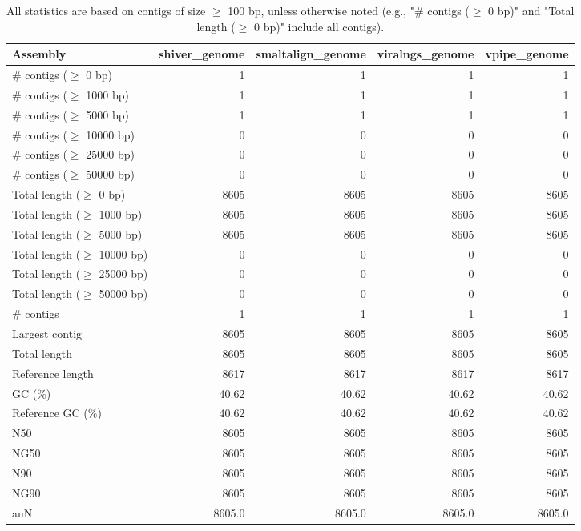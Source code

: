 \documentclass[12pt,a4paper]{article}
\begin{document}
\begin{table}[ht]
\begin{center}
\caption{All statistics are based on contigs of size $\geq$ 100 bp, unless otherwise noted (e.g., "\# contigs ($\geq$ 0 bp)" and "Total length ($\geq$ 0 bp)" include all contigs).}
\begin{tabular}{|l*{4}{|r}|}
\hline
Assembly & shiver\_genome & smaltalign\_genome & viralngs\_genome & vpipe\_genome \\ \hline
\# contigs ($\geq$ 0 bp) & 1 & 1 & 1 & 1 \\ \hline
\# contigs ($\geq$ 1000 bp) & 1 & 1 & 1 & 1 \\ \hline
\# contigs ($\geq$ 5000 bp) & 1 & 1 & 1 & 1 \\ \hline
\# contigs ($\geq$ 10000 bp) & 0 & 0 & 0 & 0 \\ \hline
\# contigs ($\geq$ 25000 bp) & 0 & 0 & 0 & 0 \\ \hline
\# contigs ($\geq$ 50000 bp) & 0 & 0 & 0 & 0 \\ \hline
Total length ($\geq$ 0 bp) & 8605 & 8605 & 8605 & 8605 \\ \hline
Total length ($\geq$ 1000 bp) & 8605 & 8605 & 8605 & 8605 \\ \hline
Total length ($\geq$ 5000 bp) & 8605 & 8605 & 8605 & 8605 \\ \hline
Total length ($\geq$ 10000 bp) & 0 & 0 & 0 & 0 \\ \hline
Total length ($\geq$ 25000 bp) & 0 & 0 & 0 & 0 \\ \hline
Total length ($\geq$ 50000 bp) & 0 & 0 & 0 & 0 \\ \hline
\# contigs & 1 & 1 & 1 & 1 \\ \hline
Largest contig & 8605 & 8605 & 8605 & 8605 \\ \hline
Total length & 8605 & 8605 & 8605 & 8605 \\ \hline
Reference length & 8617 & 8617 & 8617 & 8617 \\ \hline
GC (\%) & 40.62 & 40.62 & 40.62 & 40.62 \\ \hline
Reference GC (\%) & 40.62 & 40.62 & 40.62 & 40.62 \\ \hline
N50 & 8605 & 8605 & 8605 & 8605 \\ \hline
NG50 & 8605 & 8605 & 8605 & 8605 \\ \hline
N90 & 8605 & 8605 & 8605 & 8605 \\ \hline
NG90 & 8605 & 8605 & 8605 & 8605 \\ \hline
auN & 8605.0 & 8605.0 & 8605.0 & 8605.0 \\ \hline

\end{tabular}
\end{center}
\end{table}
\end{document}
